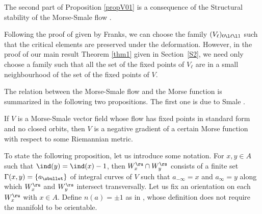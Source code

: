 \begin{re}
The second part of Proposition \ref{propV01} is a consequence of
the Structural stability of the Morse-Smale flow \cite{Palis68,PalisSmale70}.
\end{re}

\begin{re}\label{reVl}
Following the proof of \cite[Prop.\,1.6]{Franks1979}
given by Franks, we can choose the family $(V_{\ell})_{0\l
\ell \l1}$ such that the critical elements are preserved
under the deformation. However, in the proof of our main result
Theorem \ref{thm1} given in Section~\ref{S2}, we need only
choose a family such that all the set of the fixed points of
$V_{\ell}$ are in a small neighbourhood of the set of the fixed points of $V$.
\end{re}

The relation between the Morse-Smale flow and the Morse function is
summarized in the following two propositions. The first one is due to
Smale \cite[Th.\,B]{S61}.

\begin{prop}
If $V$ is a Morse-Smale vector field whose flow has fixed points
in standard form and no closed orbits, then $V$ is a negative gradient of
a certain Morse function with respect to some Riemannian metric.
\end{prop}

To state the following proposition, let us introduce some notation.
For $x,y\in A$ such that $\ind(y)=\ind(x)-1$, then $W^{\ru}_{x}\cap W^{\rs}_{y}$
consists of a finite set $\Gamma(x,y)=\{a_{\sbullet}\}$ of integral curves of
$V$ such that $a_{-\infty}=x$ and $a_{\infty}=y$ along
which $W^{\ru}_{x}$ and $W^{\rs}_{y}$ intersect transversally. Let us fix
an orientation on each $W^{\ru}_{x}$ with $x\in A$. Define
$n(a)=\pm1$ as in \cite[(1.28)]{BZ92}, whose definition does not
require the manifold to be orientable.

